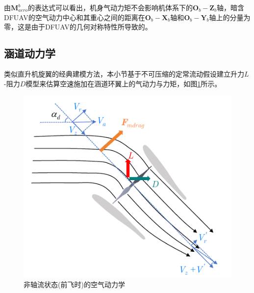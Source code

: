 由$\boldsymbol{M}_{aero}^b$的表达式可以看出，机身气动力矩不会影响机体系下的${\boldsymbol{O}_b}-{\boldsymbol{Z}_b}$轴，暗含DFUAV的空气动力中心和其重心之间的距离在${\boldsymbol{O}_b}-{\boldsymbol{X}_b}$轴和${\boldsymbol{O}_b}-{\boldsymbol{Y}_b}$轴上的分量为零，这是由于DFUAV的几何对称特性所导致的。

\subsection{涵道动力学}

类似直升机旋翼的经典建模方法，本小节基于不可压缩的定常流动假设建立升力$L$-阻力$D$模型来估算空速施加在涵道环翼上的气动力与力矩\cite{johnsonModelingControlFlight2006b}，如图\ref{非轴流状态}所示。

\begin{figure}[htbp]
	\centering
	\begin{minipage}[c]{1\textwidth}
		\centering
		\includegraphics[scale=1]{Fig/非轴流状态.pdf}
		\caption{\label{非轴流状态}非轴流状态(前飞时)的空气动力学}
	\end{minipage}%
\end{figure}

